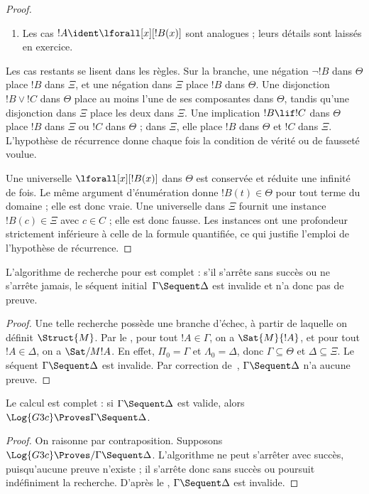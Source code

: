 \documentclass[../../../include/open-logic-section]{subfiles}
\begin{document}
\begin{proof}
\begin{enumerate}
  \item Les cas $!A \ident \lforall[x][!B(x)]$
  sont analogues ; leurs détails sont laissés
  en exercice.
\end{enumerate}

Les cas restants se lisent dans les règles.
Sur la branche, une négation
$\lnot !B$ dans $\Theta$ place $!B$ dans $\Xi$,
et une négation dans $\Xi$ place $!B$ dans $\Theta$.
Une disjonction $!B \lor !C$ dans $\Theta$
place au moins l'une de ses composantes dans
$\Theta$, tandis qu'une disjonction dans $\Xi$
place les deux dans $\Xi$.
Une implication $!B \lif !C$ dans $\Theta$
place $!B$ dans $\Xi$ ou $!C$ dans $\Theta$ ;
dans $\Xi$, elle place $!B$ dans $\Theta$
et $!C$ dans $\Xi$.
L'hypothèse de récurrence donne chaque fois
la condition de vérité ou de fausseté voulue.

Une universelle $\lforall[x][!B(x)]$ dans
$\Theta$ est conservée et réduite une infinité
de fois. Le même argument d'énumération donne
$!B(t) \in \Theta$ pour tout terme du domaine ;
elle est donc vraie. Une universelle dans
$\Xi$ fournit une instance $!B(c) \in \Xi$
avec $c \in C$ ; elle est donc fausse.
Les instances ont une profondeur strictement
inférieure à celle de la formule quantifiée,
ce qui justifie l'emploi de l'hypothèse de
récurrence.
%
\end{proof}

\begin{cor}
L'algorithme de recherche pour  est complet :
s'il s'arrête sans succès ou ne s'arrête jamais,
le séquent initial~$\Gamma \Sequent \Delta$
est invalide et n'a donc pas de preuve.
\end{cor}

\begin{proof}
Une telle recherche possède une branche d'échec,
à partir de laquelle on définit $\Struct{M}$.
Par le , pour tout $!A \in \Gamma$,
on a $\Sat{M}{!A}$, et pour tout $!A \in \Delta$,
on a $\Sat/{M}{!A}$. En effet, $\Pi_0 = \Gamma$
et $\Lambda_0 = \Delta$, donc
$\Gamma \subseteq \Theta$ et $\Delta \subseteq \Xi$.
Le séquent $\Gamma \Sequent \Delta$ est invalide.
Par correction de~,
$\Gamma \Sequent \Delta$ n'a aucune preuve.
\end{proof}

\begin{cor}
Le calcul  est complet :
si $\Gamma \Sequent \Delta$ est valide,
alors $\Log{G3c} \Proves \Gamma \Sequent \Delta$.
\end{cor}

\begin{proof}
On raisonne par contraposition. Supposons
$\Log{G3c} \Proves/ \Gamma \Sequent \Delta$.
L'algorithme ne peut s'arrêter avec succès,
puisqu'aucune preuve n'existe ; il s'arrête
donc sans succès ou poursuit indéfiniment
la recherche. D'après le ,
$\Gamma \Sequent \Delta$ est invalide.
\end{proof}
\end{document}
